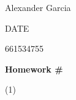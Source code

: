 \documentclass[]{article}
\begin{document}
Alexander Garcia

DATE

661534755

\centerline{\bf \Large Homework \#}

\medskip

\noindent (1)
\end{document}
